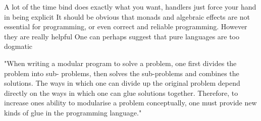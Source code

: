 A lot of the time bind does exactly what you want,
handlers just force your hand in being explicit
It should be obvious that monads and algebraic effects
are not essential for programming,
or even correct and reliable programming.
However they are really helpful
One can perhaps suggest that pure languages are too dogmatic

"When writing a modular program to solve a problem, one first divides the problem into sub- problems, then solves the sub-problems and combines the solutions. The ways in which one can divide up the original problem depend directly on the ways in which one can glue solutions together. Therefore, to increase ones ability to modularise a problem conceptually, one must provide new kinds of glue in the programming language."
\cite{hughes1989functional}
